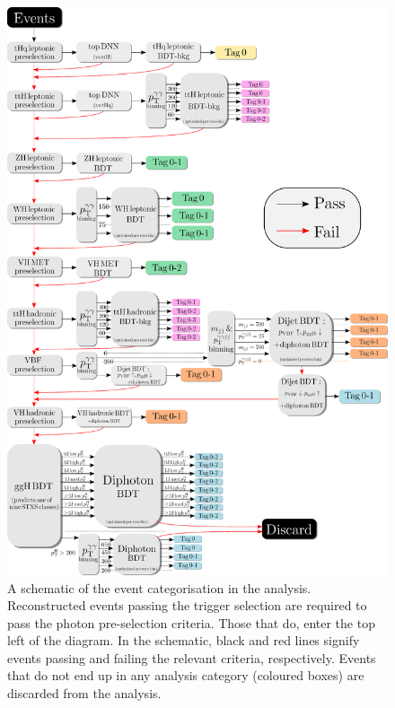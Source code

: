 \begin{figure}
  \centering
  \includegraphics[width=.9\textwidth]{Figures/app_categorisation/categorisation_schematic.pdf}
  \caption[Schematic of the \Hgg event categorisation]
  {
    A schematic of the event categorisation in the \Hgg analysis. Reconstructed events passing the trigger selection are required to pass the photon pre-selection criteria. Those that do, enter the top left of the diagram. In the schematic, black and red lines signify events passing and failing the relevant criteria, respectively. Events that do not end up in any analysis category (coloured boxes) are discarded from the analysis.
  }
  \label{fig:categorisation_schematic}
\end{figure}
